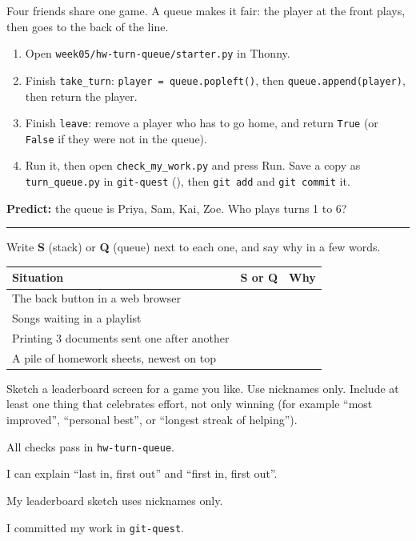\namedateline

\begin{core}
Four friends share one game. A queue makes it fair: the player at the front plays, then goes to the back of the line.
\begin{enumerate}[itemsep=2pt]
  \item Open \texttt{week05/hw-turn-queue/starter.py} in Thonny.
  \item Finish \texttt{take\_turn}: \texttt{player = queue.popleft()}, then \texttt{queue.append(player)}, then return the player.
  \item Finish \texttt{leave}: remove a player who has to go home, and return \texttt{True} (or \texttt{False} if they were not in the queue).
  \item Run it, then open \texttt{check\_my\_work.py} and press Run. Save a copy as \texttt{turn\_queue.py} in \texttt{git-quest} (), then \texttt{git add} and \texttt{git commit} it.
\end{enumerate}
\textbf{Predict:} the queue is Priya, Sam, Kai, Zoe. Who plays turns 1 to 6? \rule{8cm}{0.4pt}
\end{core}

\begin{challenge}
Write \textbf{S} (stack) or \textbf{Q} (queue) next to each one, and say why in a few words.
\begin{center}
\renewcommand{\arraystretch}{1.5}
\begin{tabular}{|p{6.5cm}|c|p{5cm}|}
\hline
\textbf{Situation} & \textbf{S or Q} & \textbf{Why} \\ \hline
The back button in a web browser & & \\ \hline
Songs waiting in a playlist & & \\ \hline
Printing 3 documents sent one after another & & \\ \hline
A pile of homework sheets, newest on top & & \\ \hline
\end{tabular}
\end{center}
\end{challenge}

\begin{creative}
Sketch a leaderboard screen for a game you like. Use nicknames only. Include at least one thing that celebrates effort, not only winning (for example \enquote{most improved}, \enquote{personal best}, or \enquote{longest streak of helping}).
\answerspace{4cm}
\end{creative}

\begin{selfcheck}
  \item All checks pass in \texttt{hw-turn-queue}.
  \item I can explain \enquote{last in, first out} and \enquote{first in, first out}.
  \item My leaderboard sketch uses nicknames only.
  \item I committed my work in \texttt{git-quest}.
\end{selfcheck}
